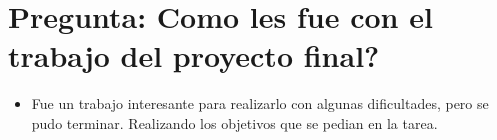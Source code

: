 \section{Pregunta: Como les fue con el trabajo del proyecto final?}
\begin{itemize}
	\item Fue un trabajo interesante para realizarlo con algunas dificultades, pero se pudo terminar. Realizando los objetivos que se pedian en la tarea.
\end{itemize}
